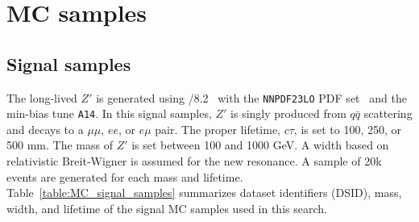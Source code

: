 \section{MC samples}
\label{sec:mc_sample}

\subsection{Signal samples}
\label{sec:signal_sample}
The long-lived $Z'$ is generated using /8.2~\cite{1126-6708-2006-05-026} with the \texttt{NNPDF23LO} PDF set~\cite{Ball:2014uwa} and the min-bias tune \texttt{A14}. In this signal samples, $Z'$ is singly produced from $q\bar{q}$ scattering and decays to a $\mu\mu$, $ee$, or $e\mu$ pair. The proper lifetime, $c\tau$, is set to 100, 250, or 500 mm. The mass of $Z'$ is set between 100 and 1000 GeV. A width based on relativistic Breit-Wigner is assumed for the new resonance. A sample of 20k events are generated for each mass and lifetime. Table~\ref{table:MC_signal_samples} summarizes dataset identifiers (DSID), mass, width, and lifetime of the signal MC samples used in this search.

